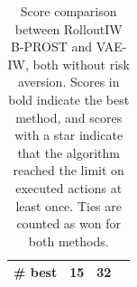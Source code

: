 \begin{table}[ht]
\begin{center}
\begin{small}
\begin{tabular}{lrrl}
\midrule

\# best & 15 &  32 \\

\bottomrule

\end{tabular}
\end{small}
\end{center}
\caption{Score comparison between RolloutIW B-PROST and VAE-IW, both without risk aversion. Scores in bold indicate the best method, and scores with a star indicate that the algorithm reached the limit on executed actions at least once. Ties are counted as won for both methods.} 
\label{tab:atari-no-ra}
\end{table}